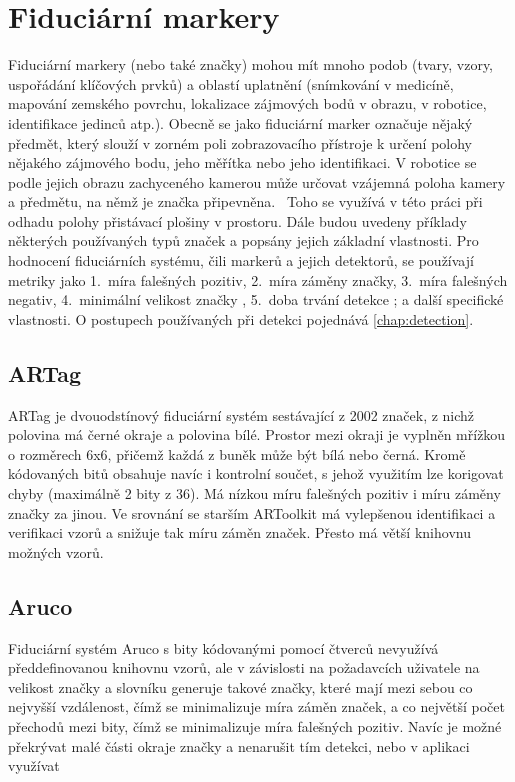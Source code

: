   \section{Fiduciární markery} \label{sec:fidu} %
    Fiduciární markery (nebo také značky) mohou mít mnoho podob (tvary, vzory, uspořádání klíčových prvků) a oblastí uplatnění (snímkování v medicíně, mapování zemského povrchu, lokalizace zájmových bodů v obrazu, v robotice, identifikace jedinců atp.). Obecně se jako fiduciární marker označuje nějaký předmět, který slouží v zorném poli zobrazovacího přístroje k určení polohy nějakého zájmového bodu, jeho měřítka nebo jeho identifikaci. V robotice se podle jejich obrazu zachyceného kamerou může určovat vzájemná poloha kamery a předmětu, na němž je značka připevněna.~\cite{kostak:fidmark} Toho se využívá v této práci při odhadu polohy přistávací plošiny v prostoru. Dále budou uvedeny příklady některých používaných typů značek a popsány jejich základní vlastnosti. Pro hodnocení fiduciárních systému, čili markerů a jejich detektorů, se používají metriky jako 1.~míra falešných pozitiv, 2.~míra záměny značky, 3.~míra falešných negativ, 4.~minimální velikost značky \cite{artag}, 5.~doba trvání detekce \cite{aruco}; \cite{apriltag2} a další specifické vlastnosti. O postupech používaných při detekci pojednává \cref{chap:detection}.
    \subsection{ARTag}
      ARTag je dvouodstínový fiduciární systém sestávající z 2002 značek, z nichž polovina má černé okraje a polovina bílé. Prostor mezi okraji je vyplněn mřížkou o rozměrech 6x6, přičemž každá z buněk může být bílá nebo černá. Kromě kódovaných bitů obsahuje navíc i kontrolní součet, s jehož využitím lze korigovat chyby (maximálně 2 bity z 36). Má nízkou míru falešných pozitiv i míru záměny značky za jinou. Ve srovnání se starším ARToolkit má vylepšenou identifikaci a verifikaci vzorů a snižuje tak míru záměn značek. Přesto má větší knihovnu možných vzorů. \cite{artag}
    \subsection{Aruco}
      Fiduciární systém Aruco s bity kódovanými pomocí čtverců nevyužívá předdefinovanou knihovnu vzorů, ale v závislosti na požadavcích uživatele na velikost značky a slovníku generuje takové značky, které mají mezi sebou co nejvyšší vzdálenost, čímž se minimalizuje míra záměn značek, a co největší počet přechodů mezi bity, čímž se minimalizuje míra falešných pozitiv. Navíc je možné překrývat malé části okraje značky a nenarušit tím detekci, nebo v aplikaci využívat

